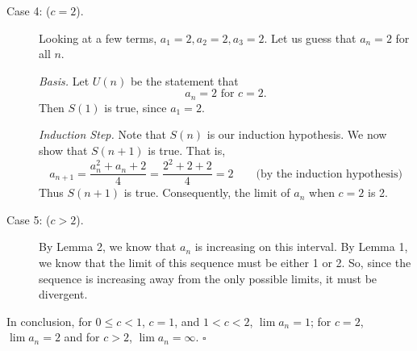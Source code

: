 \documentclass[12pt,letterpaper]{article}
\begin{document}
\begin{description}
\item[Case 4: ($c=2$).] Looking at a few terms, $a_1=2,a_2=2,a_3=2$. Let us guess that $a_n=2$ for all $n$.

\emph{Basis.} Let $U(n)$ be the statement that
\[
a_n=2 \mbox{ for } c=2.
\]
Then $S(1)$ is true, since $a_1=2$.

\emph{Induction Step.} Note that $S(n)$ is our induction hypothesis. We now show that $S(n+1)$ is true. That is,
\[
a_{n+1} = \frac{a_n^2+a_n+2}{4} = \frac{2^2+2+2}{4} = 2 \qquad \mbox{(by the induction hypothesis)}
\]
Thus $S(n+1)$ is true. Consequently, the limit of $a_n$ when $c=2$ is 2.

\item[Case 5: ($c>2$).] By Lemma 2, we know that $a_n$ is increasing on this interval. By Lemma 1, we know that the limit of this sequence must be either 1 or 2. So, since the sequence is increasing away from the only possible limits, it must be divergent.
\end{description}

In conclusion, for $0 \leq c < 1$, $c = 1$, and $1<c<2$, $\lim{a_n}=1$; for $c=2$, $\lim{a_n}=2$ and for $c>2$, $\lim{a_n}=\infty$.  \hfill$\square$ 


\end{document}
